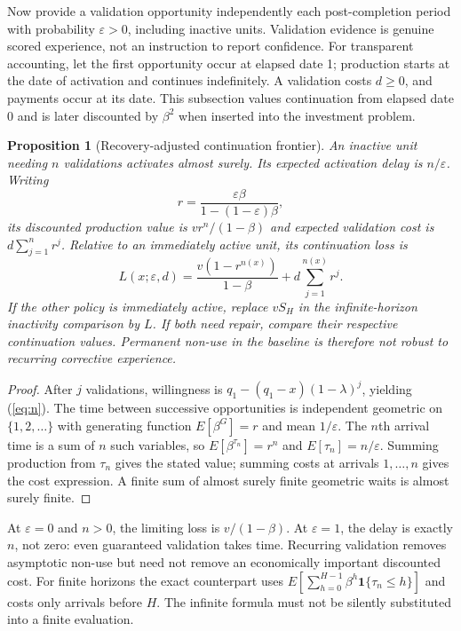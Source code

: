 \documentclass[11pt]{article}
\newtheorem{proposition}{Proposition}
\newcommand{\ind}{\mathbf{1}}
\begin{document}
Now provide a validation opportunity independently each post-completion period with probability $\varepsilon>0$, including inactive units. Validation evidence is genuine scored experience, not an instruction to report confidence. For transparent accounting, let the first opportunity occur at elapsed date 1; production starts at the date of activation and continues indefinitely. A validation costs $d\geq0$, and payments occur at its date. This subsection values continuation from elapsed date 0 and is later discounted by $\beta^2$ when inserted into the investment problem.
\begin{proposition}[Recovery-adjusted continuation frontier]\label{prop:recovery}
An inactive unit needing $n$ validations activates almost surely. Its expected activation delay is $n/\varepsilon$. Writing
\begin{equation}
 r=\frac{\varepsilon\beta}{1-(1-\varepsilon)\beta},
\end{equation}
its discounted production value is $vr^n/(1-\beta)$ and expected validation cost is $d\sum_{j=1}^n r^j$. Relative to an immediately active unit, its continuation loss is
\begin{equation}
 L(x;\varepsilon,d)=\frac{v(1-r^{n(x)})}{1-\beta}
                    +d\sum_{j=1}^{n(x)}r^j.\label{eq:loss}
\end{equation}
If the other policy is immediately active, replace $vS_H$ in the infinite-horizon inactivity comparison by $L$. If both need repair, compare their respective continuation values. Permanent non-use in the baseline is therefore not robust to recurring corrective experience.
\end{proposition}
\begin{proof}
After $j$ validations, willingness is $q_1-(q_1-x)(1-\lambda)^j$, yielding (\ref{eq:n}). The time between successive opportunities is independent geometric on $\{1,2,\ldots\}$ with generating function $E[\beta^G]=r$ and mean $1/\varepsilon$. The $n$th arrival time is a sum of $n$ such variables, so $E[\beta^{\tau_n}]=r^n$ and $E[\tau_n]=n/\varepsilon$. Summing production from $\tau_n$ gives the stated value; summing costs at arrivals $1,\ldots,n$ gives the cost expression. A finite sum of almost surely finite geometric waits is almost surely finite.
\end{proof}
At $\varepsilon=0$ and $n>0$, the limiting loss is $v/(1-\beta)$. At $\varepsilon=1$, the delay is exactly $n$, not zero: even guaranteed validation takes time. Recurring validation removes asymptotic non-use but need not remove an economically important discounted cost. For finite horizons the exact counterpart uses $E[\sum_{h=0}^{H-1}\beta^h\ind\{\tau_n\leq h\}]$ and costs only arrivals before $H$. The infinite formula must not be silently substituted into a finite evaluation.
\end{document}
